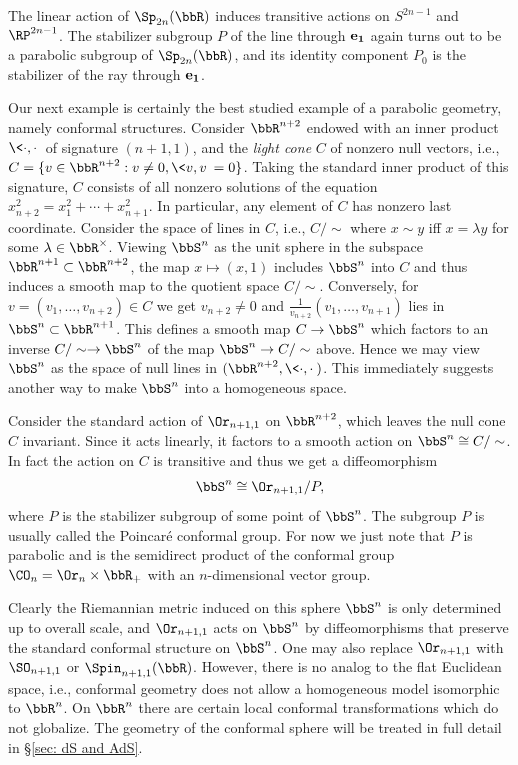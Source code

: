 \begin{defn}
    The linear action of $\Sp_{2n}(\bbR)$ induces transitive actions on $S^{2n-1}$ and $\RP^{2n-1}$. The stabilizer subgroup $P$ of the line through $\bf{e}_1$ again turns out to be a parabolic subgroup of $\Sp_{2n}(\bbR)$, and its identity component $P_0$ is the stabilizer of the ray through $\bf{e}_1$.
\end{defn}


Our next example is certainly the best studied example of a parabolic geometry, namely conformal structures. Consider $\bbR^{n+2}$ endowed with an inner product $\<\cdot,\cdot\>$ of signature $(n+1,1)$, and the \emph{light cone} $C$ of nonzero null vectors, i.e., $C=\{v\in\bbR^{n+2}:v\neq 0,\<v,v\>=0\}$. Taking the standard inner product of this signature, $C$ consists of all nonzero solutions of the equation $x_{n+2}^2=x_1^2+\cdots +x_{n+1}^2$. In particular, any element of $C$ has nonzero last coordinate. Consider the space of lines in $C$, i.e., $C\slash \sim$ where $x\sim y$ iff $x=\lambda y$ for some $\lambda \in \bbR^\times$. Viewing $\bbS^n$ as the unit sphere in the subspace $\bbR^{n+1}\subset \bbR^{n+2}$, the map $x\mapsto (x,1)$ includes $\bbS^n$ into $C$ and thus induces a smooth map to the quotient space $C\slash \sim$. Conversely, for $v=(v_1,\ldots,v_{n+2})\in C$ we get $v_{n+2}\neq 0$ and $\frac{1}{v_{n+2}}(v_1,\ldots,v_{n+1})$ lies in $\bbS^n\subset \bbR^{n+1}$. This defines a smooth map $C\to \bbS^n$ which factors to an inverse $C\slash \sim\to \bbS^n$ of the map $\bbS^n\to C\slash \sim$ above. Hence we may view $\bbS^n$ as the space of null lines in $(\bbR^{n+2},\<\cdot,\cdot\>)$. This immediately suggests another way to make $\bbS^n$ into a homogeneous space.

\begin{defn}
    Consider the standard action of $\Or_{n+1,1}$ on $\bbR^{n+2}$, which leaves the null cone $C$ invariant. Since it acts linearly, it factors to a smooth action on $\bbS^n\cong C\slash \sim$. In fact the action on $C$ is transitive and thus we get a diffeomorphism
    \[\bbS^n\cong \Or_{n+1,1}\slash P,\]
    where $P$ is the stabilizer subgroup of some point of $\bbS^n$. The subgroup $P$ is usually called the Poincar\'e conformal group. For now we just note that $P$ is parabolic and is the semidirect product of the conformal group $\CO_n=\Or_n\times\bbR_+$ with an $n$-dimensional vector group.
\end{defn}

Clearly the Riemannian metric induced on this sphere $\bbS^n$ is only determined up to overall scale, and $\Or_{n+1,1}$ acts on $\bbS^n$ by diffeomorphisms that preserve the standard conformal structure on $\bbS^n$. One may also replace $\Or_{n+1,1}$ with $\SO_{n+1,1}$ or $\Spin_{n+1,1}(\bbR)$. However, there is no analog to the flat Euclidean space, i.e., conformal geometry does not allow a homogeneous model isomorphic to $\bbR^n$. On $\bbR^n$ there are certain local conformal transformations which do not globalize. The geometry of the conformal sphere will be treated in full detail in \S\ref{sec: dS and AdS}.

